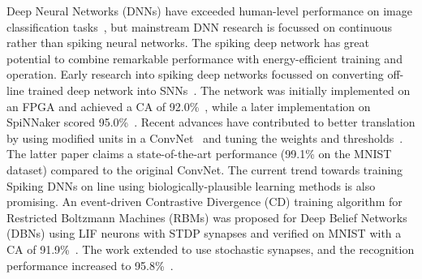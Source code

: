 Deep Neural Networks (DNNs) have exceeded human-level performance on image classification tasks~\cite{he2015delving}, but mainstream DNN research is focussed on continuous rather than spiking neural networks.
The spiking deep network has great potential to combine remarkable performance with energy-efficient training and operation.
Early research into spiking deep networks focussed on converting off-line trained deep network into SNNs~\cite{o2013real}.
The network was initially implemented on an FPGA and achieved a CA of 92.0\%~\cite{neil2014minitaur}, while a later implementation on SpiNNaker scored 95.0\%~\cite{Stromatias2015scalable}.
Recent advances have contributed to better translation by using modified units in a ConvNet~\cite{cao2015spiking} and tuning the weights and thresholds~\cite{diehl2015fast}.
The latter paper claims a state-of-the-art performance (99.1\% on the MNIST dataset) compared to the original ConvNet.
The current trend towards training Spiking DNNs on line using biologically-plausible learning methods is also promising.
An event-driven Contrastive Divergence (CD) training algorithm for Restricted Boltzmann Machines (RBMs) was proposed for Deep Belief Networks (DBNs) using LIF neurons with STDP synapses and verified on MNIST with a CA of 91.9\%~\cite{neftci2013event}.
The work extended to use stochastic synapses, and the recognition performance increased to 95.8\%~\cite{neftci2016stochastic}.


